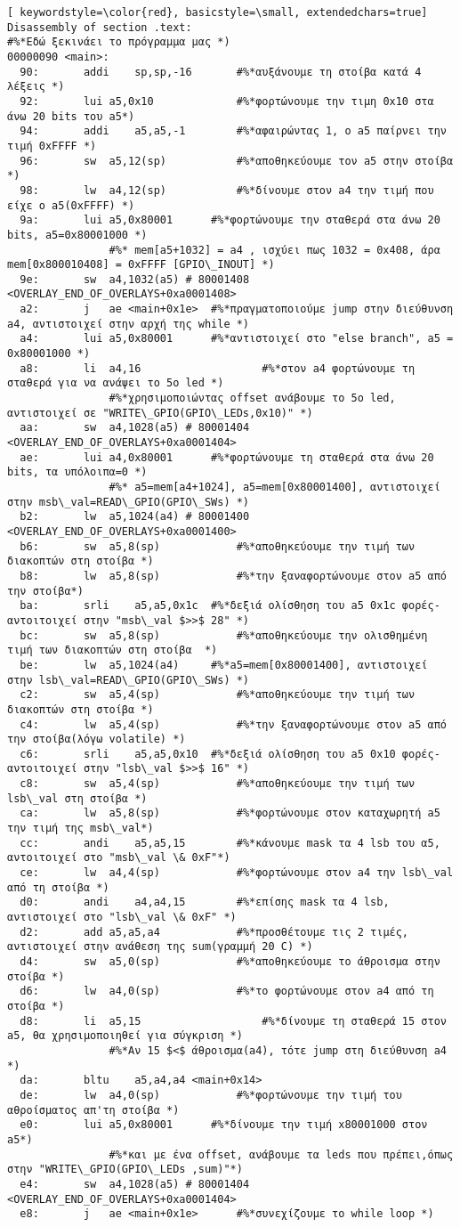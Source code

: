 \documentclass[a4paper]{article}
\begin{document}
\begin{lstlisting}[ keywordstyle=\color{red}, basicstyle=\small, extendedchars=true]
Disassembly of section .text:
#%*Εδώ ξεκινάει το πρόγραμμα μας *)
00000090 <main>:
  90:		addi	sp,sp,-16		#%*αυξάνουμε τη στοίβα κατά 4 λέξεις *)
  92:		lui	a5,0x10				#%*φορτώνουμε την τιμη 0x10 στα άνω 20 bits του a5*)
  94:		addi	a5,a5,-1		#%*αφαιρώντας 1, ο a5 παίρνει την τιμή 0xFFFF *)
  96:		sw	a5,12(sp)			#%*αποθηκεύουμε τον a5 στην στοίβα  *)
  98:		lw	a4,12(sp)			#%*δίνουμε στον a4 την τιμή που είχε ο a5(0xFFFF) *)
  9a:		lui	a5,0x80001		#%*φορτώνουμε την σταθερά στα άνω 20 bits, a5=0x80001000 *)
				#%* mem[a5+1032] = a4 , ισχύει πως 1032 = 0x408, άρα mem[0x800010408] = 0xFFFF [GPIO\_INOUT] *)
  9e:		sw	a4,1032(a5) # 80001408 <OVERLAY_END_OF_OVERLAYS+0xa0001408>
  a2:		j	ae <main+0x1e>	#%*πραγματοποιούμε jump στην διεύθυνση a4, αντιστοιχεί στην αρχή της while *)
  a4:		lui	a5,0x80001		#%*αντιστοιχεί στο "else branch", a5 = 0x80001000 *)
  a8:		li	a4,16					#%*στον a4 φορτώνουμε τη σταθερά για να ανάψει το 5ο led *)	
				#%*χρησιμοποιώντας offset ανάβουμε το 5ο led, αντιστοιχεί σε "WRITE\_GPIO(GPIO\_LEDs,0x10)" *)
  aa:		sw	a4,1028(a5) # 80001404 <OVERLAY_END_OF_OVERLAYS+0xa0001404>
  ae:		lui	a4,0x80001		#%*φορτώνουμε τη σταθερά στα άνω 20 bits, τα υπόλοιπα=0 *)
				#%* a5=mem[a4+1024], a5=mem[0x80001400], αντιστοιχεί στην msb\_val=READ\_GPIO(GPIO\_SWs) *)
  b2:		lw	a5,1024(a4) # 80001400 <OVERLAY_END_OF_OVERLAYS+0xa0001400>
  b6:		sw	a5,8(sp)			#%*αποθηκεύουμε την τιμή των διακοπτών στη στοίβα *)
  b8:		lw	a5,8(sp)			#%*την ξαναφορτώνουμε στον a5 από την στοίβα*)
  ba:		srli	a5,a5,0x1c	#%*δεξιά ολίσθηση του a5 0x1c φορές-αντοιτοιχεί στην "msb\_val $>>$ 28" *)
  bc:		sw	a5,8(sp)			#%*αποθηκεύουμε την ολισθημένη τιμή των διακοπτών στη στοίβα  *)
  be:		lw	a5,1024(a4)		#%*a5=mem[0x80001400], αντιστοιχεί στην lsb\_val=READ\_GPIO(GPIO\_SWs) *)
  c2:		sw	a5,4(sp)			#%*αποθηκεύουμε την τιμή των διακοπτών στη στοίβα *)
  c4:		lw	a5,4(sp)			#%*την ξαναφορτώνουμε στον a5 από την στοίβα(λόγω volatile) *)
  c6:		srli	a5,a5,0x10	#%*δεξιά ολίσθηση του a5 0x10 φορές-αντοιτοιχεί στην "lsb\_val $>>$ 16" *)
  c8:		sw	a5,4(sp)			#%*αποθηκεύουμε την τιμή των lsb\_val στη στοίβα *)
  ca:		lw	a5,8(sp)			#%*φορτώνουμε στον καταχωρητή a5 την τιμή της msb\_val*)
  cc:		andi	a5,a5,15		#%*κάνουμε mask τα 4 lsb του α5, αντοιτοιχεί στο "msb\_val \& 0xF"*)
  ce:		lw	a4,4(sp)			#%*φορτώνουμε στον a4 την lsb\_val από τη στοίβα *)
  d0:		andi	a4,a4,15		#%*επίσης mask τα 4 lsb, αντιστοιχεί στο "lsb\_val \& 0xF" *)
  d2:		add	a5,a5,a4			#%*προσθέτουμε τις 2 τιμές, αντιστοιχεί στην ανάθεση της sum(γραμμή 20 C) *)
  d4:		sw	a5,0(sp)			#%*αποθηκεύουμε το άθροισμα στην στοίβα *)
  d6:		lw	a4,0(sp)			#%*το φορτώνουμε στον a4 από τη στοίβα *)
  d8:		li	a5,15					#%*δίνουμε τη σταθερά 15 στον a5, θα χρησιμοποιηθεί για σύγκριση *)
				#%*Αν 15 $<$ άθροισμα(a4), τότε jump στη διεύθυνση a4 *)
  da:		bltu	a5,a4,a4 <main+0x14>
  de:		lw	a4,0(sp)			#%*φορτώνουμε την τιμή του αθροίσματος απ'τη στοίβα *)
  e0:		lui	a5,0x80001		#%*δίνουμε την τιμή x80001000 στον a5*)
				#%*και με ένα offset, ανάβουμε τα leds που πρέπει,όπως στην "WRITE\_GPIO(GPIO\_LEDs ,sum)"*)
  e4:		sw	a4,1028(a5) # 80001404 <OVERLAY_END_OF_OVERLAYS+0xa0001404>
  e8:		j	ae <main+0x1e>		#%*συνεχίζουμε το while loop *)


\end{lstlisting}
\end{document}
